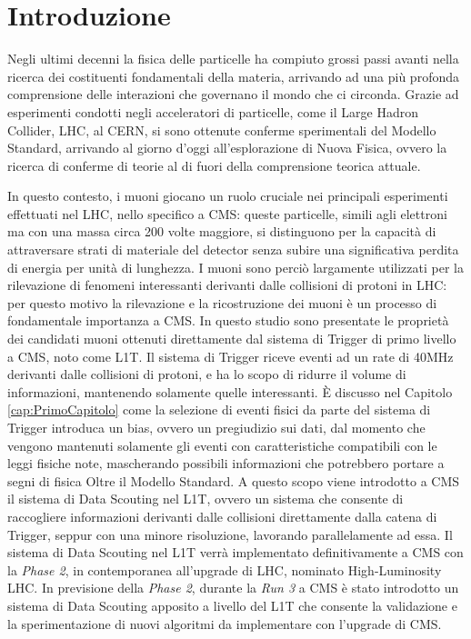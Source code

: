 \chapter{Introduzione}
\label{cap:Introduzione}

Negli ultimi decenni la fisica delle particelle ha compiuto grossi passi avanti nella ricerca dei costituenti fondamentali della materia, arrivando ad una più profonda comprensione delle interazioni che governano il mondo che ci circonda. Grazie ad esperimenti condotti negli acceleratori di particelle, come il Large Hadron Collider, LHC, al CERN, si sono ottenute conferme sperimentali del Modello Standard, arrivando al giorno d'oggi all'esplorazione di Nuova Fisica, ovvero la ricerca di conferme di teorie al di fuori della comprensione teorica attuale.

In questo contesto, i muoni giocano un ruolo cruciale nei principali esperimenti effettuati nel LHC, nello specifico a CMS: queste particelle, simili agli elettroni ma con una massa circa 200 volte maggiore, si distinguono per la capacità di attraversare strati di materiale del detector senza subire una significativa perdita di energia per unità di lunghezza. I muoni sono perciò largamente utilizzati per la rilevazione di fenomeni interessanti derivanti dalle collisioni di protoni in LHC: per questo motivo la rilevazione e la ricostruzione dei muoni è un processo di fondamentale importanza a CMS.\newline
In questo studio sono presentate le proprietà dei candidati muoni ottenuti direttamente dal sistema di Trigger di primo livello a CMS, noto come L1T. Il sistema di Trigger riceve eventi ad un rate di 40MHz derivanti dalle collisioni di protoni, e ha lo scopo di ridurre il volume di informazioni, mantenendo solamente quelle interessanti.
È discusso nel Capitolo \ref{cap:PrimoCapitolo} come la selezione di eventi fisici da parte del sistema di Trigger introduca un bias, ovvero un pregiudizio sui dati, dal momento che vengono mantenuti solamente gli eventi con caratteristiche compatibili con le leggi fisiche note, mascherando possibili informazioni che potrebbero portare a segni di fisica Oltre il Modello Standard. A questo scopo viene introdotto a CMS il sistema di Data Scouting nel L1T, ovvero un sistema che consente di raccogliere informazioni derivanti dalle collisioni direttamente dalla catena di Trigger, seppur con una minore risoluzione, lavorando parallelamente ad essa. Il sistema di Data Scouting nel L1T verrà implementato definitivamente a CMS con la \textit{Phase 2}, in contemporanea all'upgrade di LHC, nominato High-Luminosity LHC. In previsione della \textit{Phase 2}, durante la \textit{Run 3} a CMS è stato introdotto un sistema di Data Scouting apposito a livello del L1T che consente la validazione e la sperimentazione di nuovi algoritmi da implementare con l'upgrade di CMS.

